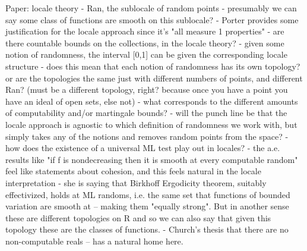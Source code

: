\documentclass[14pt]{extarticle}
\begin{document}
\begin{commentout}
Paper: locale theory
- Ran, the sublocale of random points
- presumably we can say some class of functions are smooth on this sublocale?
- Porter provides some justification for the locale approach since it's "all measure 1 properties"
- are there countable bounds on the collections, in the locale theory?
- given some notion of randomness, the interval [0,1] can be given the corresponding locale structure
- does this mean that each notion of randomness has its own topology? or are the topologies the same just with different numbers of points, and different Ran? (must be a different topology, right? because once you have a point you have an ideal of open sets, else not)
- what corresponds to the different amounts of computability and/or martingale bounds?
- will the punch line be that the locale approach is agnostic to which definition of randomness we work with, but simply takes any of the notions and removes random points from the space?
- how does the existence of a universal ML test play out in locales?
- the a.e. results like "if f is nondecreasing then it is smooth at every computable random" feel like statements about cohesion, and this feels natural in the locale interpretation
- she is saying that Birkhoff Ergodicity theorem, suitably effectivized, holds at ML randoms, i.e. the same set that functions of bounded variation are smooth at -- making them "equally strong". But in another sense these are different topologies on R and so we can also say that given this topology these are the classes of functions.
- Church's thesis that there are no non-computable reals -- has a natural home here.
\end{commentout}


\end{document}
